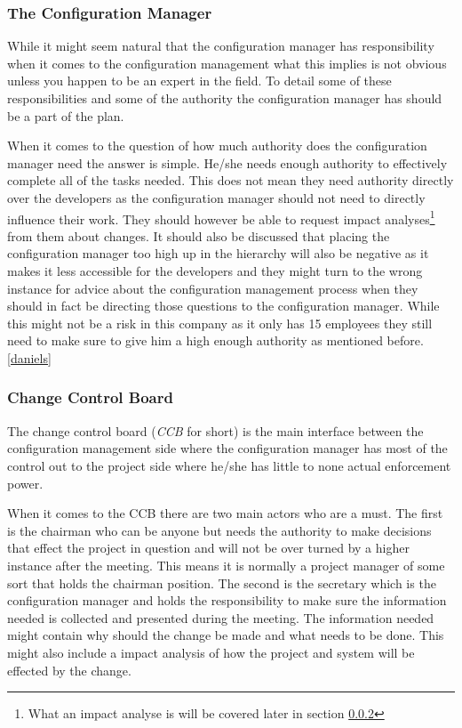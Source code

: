 \documentclass[a4paper]{article}
\begin{document}
\subsubsection{The Configuration Manager}
While it might seem natural that the configuration manager has responsibility when it comes to the configuration management what this implies is not obvious unless you happen to be an expert in the field. To detail some of these responsibilities and some of the authority the configuration manager has should be a part of the plan.

When it comes to the question of how much authority does the configuration manager need the answer is simple. He/she needs enough authority to effectively complete all of the tasks needed. This does not mean they need authority directly over the developers as the configuration manager should not need to directly influence their work. They should however be able to request impact analyses\footnote{What an impact analyse is will be covered later in section \ref{CCB}} from them about changes. It should also be discussed that placing the configuration manager too high up in the hierarchy will also be negative as it makes it less accessible for the developers and they might turn to the wrong instance for advice about the configuration management process when they should in fact be directing those questions to the configuration manager. While this might not be a risk in this company as it only has 15 employees they still need to make sure to give him a high enough authority as mentioned before.\ref{daniels}

\subsubsection{Change Control Board}\label{CCB}
The change control board (\emph{CCB} for short) is the main interface between the configuration management side where the configuration manager has most of the control out to the project side where he/she has little to none actual enforcement power. 

When it comes to the CCB there are two main actors who are a must. The first is the chairman who can be anyone but needs the authority to make decisions that effect the project in question and will not be over turned by a higher instance after the meeting. This means it is normally a project manager of some sort that holds the chairman position. The second is the secretary which is the configuration manager and holds the responsibility to make sure the information needed is collected and presented during the meeting. The information needed might contain why should the change be made and what needs to be done. This might also include a impact analysis of how the project and system will be effected by the change.
\end{document}
